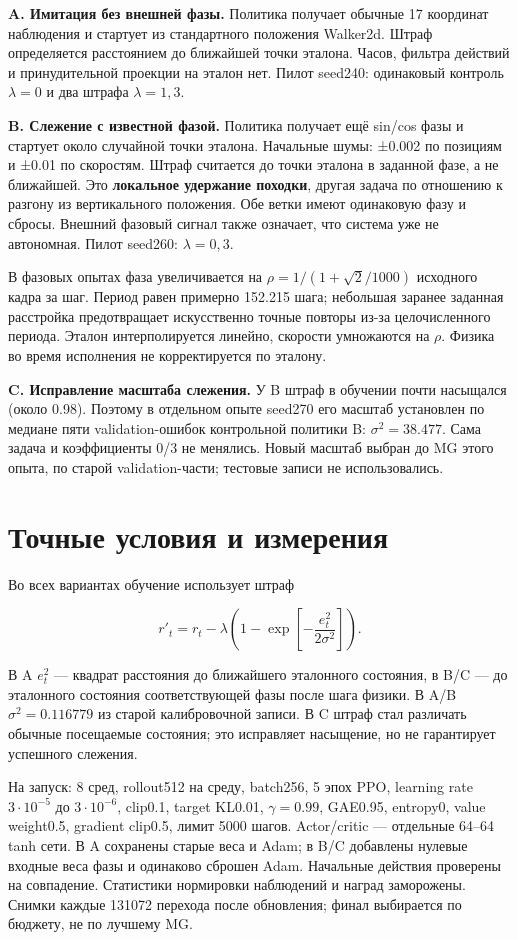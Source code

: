 \documentclass[10pt,a4paper]{article}
\begin{document}
\textbf{A. Имитация без внешней фазы.} Политика получает обычные 17 координат наблюдения и стартует из стандартного положения Walker2d. Штраф определяется расстоянием до ближайшей точки эталона. Часов, фильтра действий и принудительной проекции на эталон нет. Пилот seed240: одинаковый контроль $\lambda=0$ и два штрафа $\lambda=1,3$.

\textbf{B. Слежение с известной фазой.} Политика получает ещё sin/cos фазы и стартует около случайной точки эталона. Начальные шумы: ±0.002 по позициям и ±0.01 по скоростям. Штраф считается до точки эталона в заданной фазе, а не ближайшей. Это \textbf{локальное удержание походки}, другая задача по отношению к разгону из вертикального положения. Обе ветки имеют одинаковую фазу и сбросы. Внешний фазовый сигнал также означает, что система уже не автономная. Пилот seed260: $\lambda=0,3$.

В фазовых опытах фаза увеличивается на $\rho=1/(1+\sqrt2/1000)$ исходного кадра за шаг. Период равен примерно 152.215 шага; небольшая заранее заданная расстройка предотвращает искусственно точные повторы из-за целочисленного периода. Эталон интерполируется линейно, скорости умножаются на $\rho$. Физика во время исполнения не корректируется по эталону.

\textbf{C. Исправление масштаба слежения.} У B штраф в обучении почти насыщался (около 0.98). Поэтому в отдельном опыте seed270 его масштаб установлен по медиане пяти validation-ошибок контрольной политики B: $\sigma^2=38.477$. Сама задача и коэффициенты 0/3 не менялись. Новый масштаб выбран до MG этого опыта, по старой validation-части; тестовые записи не использовались.

\newpage
\section*{Точные условия и измерения}

Во всех вариантах обучение использует штраф

\[
r'_t=r_t-\lambda\left(1-\exp\left[-\frac{e_t^2}{2\sigma^2}\right]\right).
\]

В A $e_t^2$ --- квадрат расстояния до ближайшего эталонного состояния, в B/C --- до эталонного состояния соответствующей фазы после шага физики. В A/B $\sigma^2=0.116779$ из старой калибровочной записи. В C штраф стал различать обычные посещаемые состояния; это исправляет насыщение, но не гарантирует успешного слежения.

На запуск: 8 сред, rollout512 на среду, batch256, 5 эпох PPO, learning rate $3\cdot10^{-5}$ до $3\cdot10^{-6}$, clip0.1, target KL0.01, $\gamma=0.99$, GAE0.95, entropy0, value weight0.5, gradient clip0.5, лимит 5000 шагов. Actor/critic --- отдельные 64--64 tanh сети. В A сохранены старые веса и Adam; в B/C добавлены нулевые входные веса фазы и одинаково сброшен Adam. Начальные действия проверены на совпадение. Статистики нормировки наблюдений и наград заморожены. Снимки каждые 131072 перехода после обновления; финал выбирается по бюджету, не по лучшему MG.
\end{document}
